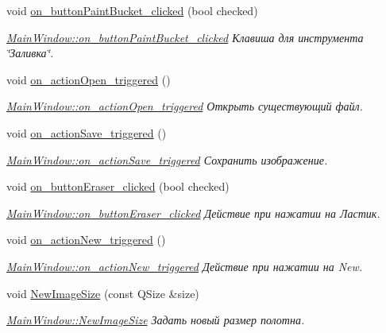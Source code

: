 \begin{DoxyCompactItemize}
void \hyperlink{class_main_window_af354b0d573d73369d2d0ad53e5d483fa}{on\+\_\+button\+Paint\+Bucket\+\_\+clicked} (bool checked)
\begin{DoxyCompactList}\small\item\em \hyperlink{class_main_window_af354b0d573d73369d2d0ad53e5d483fa}{Main\+Window\+::on\+\_\+button\+Paint\+Bucket\+\_\+clicked} Клавиша для инструмента \char`\"{}Заливка\char`\"{}. \end{DoxyCompactList}\item 
void \hyperlink{class_main_window_a48ed0a16f674e38e0e2a24274852a9af}{on\+\_\+action\+Open\+\_\+triggered} ()
\begin{DoxyCompactList}\small\item\em \hyperlink{class_main_window_a48ed0a16f674e38e0e2a24274852a9af}{Main\+Window\+::on\+\_\+action\+Open\+\_\+triggered} Открыть существующий файл. \end{DoxyCompactList}\item 
void \hyperlink{class_main_window_ad550c61cfa05c7e528dedc6cf636ed10}{on\+\_\+action\+Save\+\_\+triggered} ()
\begin{DoxyCompactList}\small\item\em \hyperlink{class_main_window_ad550c61cfa05c7e528dedc6cf636ed10}{Main\+Window\+::on\+\_\+action\+Save\+\_\+triggered} Сохранить изображение. \end{DoxyCompactList}\item 
void \hyperlink{class_main_window_a00233c80edbf8e0a6c43b4f0131d72d1}{on\+\_\+button\+Eraser\+\_\+clicked} (bool checked)
\begin{DoxyCompactList}\small\item\em \hyperlink{class_main_window_a00233c80edbf8e0a6c43b4f0131d72d1}{Main\+Window\+::on\+\_\+button\+Eraser\+\_\+clicked} Действие при нажатии на Ластик. \end{DoxyCompactList}\item 
void \hyperlink{class_main_window_aed8d4c16aaa87ae02a2de2edd5fc91c7}{on\+\_\+action\+New\+\_\+triggered} ()
\begin{DoxyCompactList}\small\item\em \hyperlink{class_main_window_aed8d4c16aaa87ae02a2de2edd5fc91c7}{Main\+Window\+::on\+\_\+action\+New\+\_\+triggered} Действие при нажатии на New. \end{DoxyCompactList}\item 
void \hyperlink{class_main_window_ac8fb265fce472c4bd780594cb8d4f6ba}{New\+Image\+Size} (const Q\+Size \&size)
\begin{DoxyCompactList}\small\item\em \hyperlink{class_main_window_ac8fb265fce472c4bd780594cb8d4f6ba}{Main\+Window\+::\+New\+Image\+Size} Задать новый размер полотна. \end{DoxyCompactList}\item 

\end{DoxyCompactItemize}
